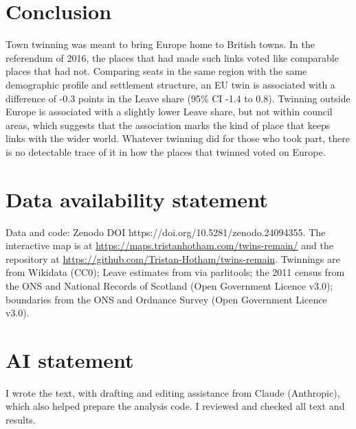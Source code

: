 \documentclass[11pt,a4paper]{article}
\begin{document}
\section{Conclusion}\label{sec:concl}
Town twinning was meant to bring Europe home to British towns. In the referendum of 2016, the places that had made such links voted like comparable places that had not. Comparing seats in the same region with the same demographic profile and settlement structure, an EU twin is associated with a difference of -0.3 points in the Leave share (95\% CI -1.4 to 0.8). Twinning outside Europe is associated with a slightly lower Leave share, but not within council areas, which suggests that the association marks the kind of place that keeps links with the wider world. Whatever twinning did for those who took part, there is no detectable trace of it in how the places that twinned voted on Europe.

\section*{Data availability statement}
Data and code: Zenodo DOI https://doi.org/10.5281/zenodo.24094355. The interactive map is at \url{https://maps.tristanhotham.com/twins-remain/} and the repository at \url{https://github.com/Tristan-Hotham/twins-remain}. Twinnings are from Wikidata (CC0); Leave estimates from \citet{hanretty2017} via parlitools; the 2011 census from the ONS and National Records of Scotland (Open Government Licence v3.0); boundaries from the ONS and Ordnance Survey (Open Government Licence v3.0).

\section*{AI statement}
I wrote the text, with drafting and editing assistance from Claude (Anthropic), which also helped prepare the analysis code. I reviewed and checked all text and results.




\clearpage
\appendix
\end{document}
